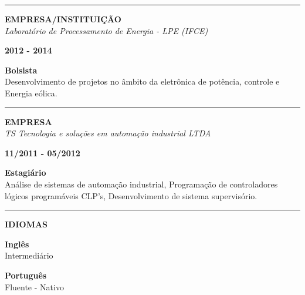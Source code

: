 \documentclass[12pt, a4paper]{article}
\newcommand{\LlinhaG}{2pt} %
\newcommand{\TlinhaG}{17cm}  %
\newcommand{\LlinhaM}{1pt} 	 %
\newcommand{\TlinhaM}{17cm}		 %
\begin{document}
\begin{center}
	\rule{\TlinhaM}{\LlinhaM}
\end{center}

\begin{multicols}{2}
	\begin{flushleft}
		\textbf{EMPRESA/INSTITUIÇÃO}\\
		\textit{Laboratório de Processamento de Energia - LPE (IFCE)}\\
	\end{flushleft}
	\vfill
	\begin{flushright}
		\textbf{2012 - 2014}\\
	\end{flushright}
\end{multicols}
\begin{flushleft}
	\textbf{Bolsista}\\
	Desenvolvimento de projetos no âmbito da eletrônica de potência, controle e Energia eólica.\\
\end{flushleft}

\begin{center}
	\rule{\TlinhaM}{\LlinhaM}
\end{center}

\begin{multicols}{2}
	\begin{flushleft}
		\textbf{EMPRESA}\\
		\textit{TS Tecnologia e soluções em automação industrial LTDA}\\
	\end{flushleft}
	\vfill
	\begin{flushright}
		\textbf{11/2011 - 05/2012}\\
	\end{flushright}
\end{multicols}
\begin{flushleft}
	\textbf{Estagiário}\\
	Análise de sistemas de automação industrial, Programação de controladores lógicos programáveis CLP’s, Desenvolvimento de sistema supervisório.\\
\end{flushleft}

\begin{center}	%
	\rule{\TlinhaG}{\LlinhaG}
\end{center}

\begin{center}
	\textbf{IDIOMAS}\\
\end{center}
\begin{flushleft}
	\textbf{Inglês}\\
	Intermediário\\
\end{flushleft}
\begin{flushleft}
	\textbf{Português}\\
	Fluente - Nativo\\
\end{flushleft}
\end{document}
